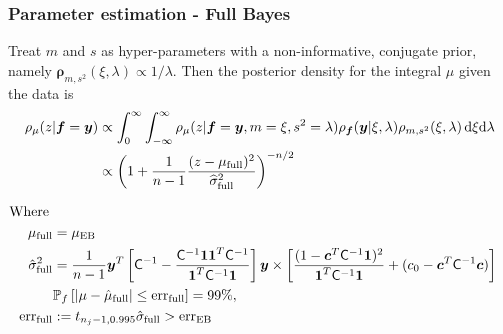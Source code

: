 \documentclass[handout, 10pt,compress,xcolor={usenames,dvipsnames}]{beamer} %
\newcommand{\bm}[1]{\boldsymbol{#1}}
\newcommand{\MLE}{\textup{EB}}
\newcommand{\full}{\textup{full}}
\newcommand{\D}[1]{\text{d}{#1}}
\newcommand{\vrho}{\bm{\rho}}
\newcommand{\err}{{\text{err}}}
\newcommand{\pause}{}
\begin{document}
\begin{frame}
\frametitle{Parameter estimation - Full Bayes}
\vspace*{-6ex}
Treat $m$ and $s$ as hyper-parameters with a non-informative, conjugate prior, namely $\vrho_{m,s^2}(\xi, \lambda) \propto 1/\lambda$.
Then the posterior density for the integral $\mu$ given the data is
\vspace*{-2.0ex}
\begin{align*}
\rho_{\mu}(z | \vf = \vy)
& \propto \int_{0}^\infty \int_{-\infty}^\infty \rho_{\mu}(z | \vf = \vy, m = \xi, s^2 = \lambda)  
\rho_{\vf}(\vy | \xi, \lambda ) \rho_{m, s^2}(\xi, \lambda) \, \D \xi \D \lambda 
\\ & \propto \left(1 +  \frac{1}{n-1} \frac{(z - \mu_{\full})^2}{\widehat{\sigma}_{\full}^2} \right)^{-n/2}
\end{align*}
\pause
\vspace{-4ex}
\begin{align*}
\text{Where} \;
\\
\mu_{\full} &= \mu_\MLE
\\
\hsigma^2_{\full} 
& = \frac{1}{n-1}
\vy^T\left[ \mC^{-1} 
- \frac{ \mC^{-1} \vone\vone^T \mC^{-1}}{\vone^T \mC^{-1} \vone}  \right]\vy
\times  \left[\frac{(1 - \vc^T \mC^{-1} \vone)^2}{\vone^T \mC^{-1} \vone} + (c_0  -\vc ^T \mC^{-1} \vc) \right]
\\ &\mathbb{P}_f \left[ |\mu-\hmu_{\full}|  \leq \err_{\full} \right]  = 99\%,
\\ \err_{\full} &:= t_{n_j-1,0.995} \hat{\sigma}_{\full} > \err_{\MLE}
\end{align*}
\end{frame}
\end{document}
